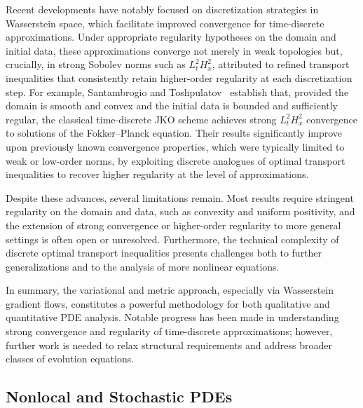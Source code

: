 \documentclass[sigconf]{acmart}
\begin{document}
Recent developments have notably focused on discretization strategies in Wasserstein space, which facilitate improved convergence for time-discrete approximations. Under appropriate regularity hypotheses on the domain and initial data, these approximations converge not merely in weak topologies but, crucially, in strong Sobolev norms such as $L^2_t H^2_x$, attributed to refined transport inequalities that consistently retain higher-order regularity at each discretization step. For example, Santambrogio and Toshpulatov~\cite{ref96} establish that, provided the domain is smooth and convex and the initial data is bounded and sufficiently regular, the classical time-discrete JKO scheme achieves strong $L^2_t H^2_x$ convergence to solutions of the Fokker--Planck equation. Their results significantly improve upon previously known convergence properties, which were typically limited to weak or low-order norms, by exploiting discrete analogues of optimal transport inequalities to recover higher regularity at the level of approximations.

Despite these advances, several limitations remain. Most results require stringent regularity on the domain and data, such as convexity and uniform positivity, and the extension of strong convergence or higher-order regularity to more general settings is often open or unresolved. Furthermore, the technical complexity of discrete optimal transport inequalities presents challenges both to further generalizations and to the analysis of more nonlinear equations.

In summary, the variational and metric approach, especially via Wasserstein gradient flows, constitutes a powerful methodology for both qualitative and quantitative PDE analysis. Notable progress has been made in understanding strong convergence and regularity of time-discrete approximations; however, further work is needed to relax structural requirements and address broader classes of evolution equations.

\subsection{Nonlocal and Stochastic PDEs}
\end{document}
